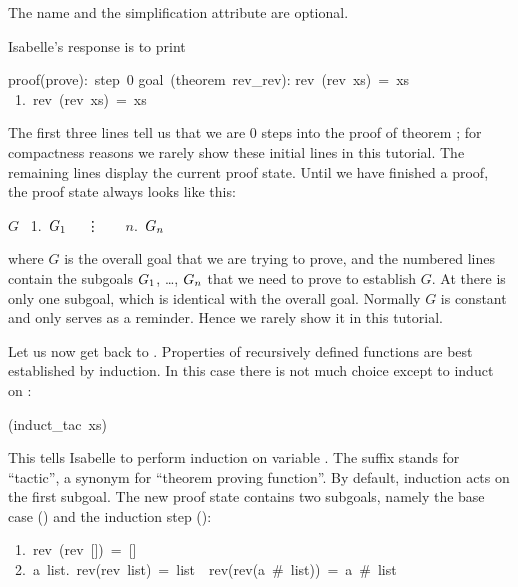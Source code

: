 \begin{isabelle}
\begin{isamarkuptxt}
\begin{itemize}
The name and the simplification attribute are optional.
\end{itemize}
Isabelle's response is to print
\begin{isabellepar}%
proof(prove):~step~0\isanewline
\isanewline
goal~(theorem~rev\_rev):\isanewline
rev~(rev~xs)~=~xs\isanewline
~1.~rev~(rev~xs)~=~xs
\end{isabellepar}%
The first three lines tell us that we are 0 steps into the proof of
theorem ; for compactness reasons we rarely show these
initial lines in this tutorial. The remaining lines display the current
proof state.
Until we have finished a proof, the proof state always looks like this:
\begin{isabellepar}%
$G$\isanewline
~1.~$G\sb{1}$\isanewline
~~\vdots~~\isanewline
~$n$.~$G\sb{n}$
\end{isabellepar}%
where $G$
is the overall goal that we are trying to prove, and the numbered lines
contain the subgoals $G\sb{1}$, \dots, $G\sb{n}$ that we need to prove to
establish $G$. At  there is only one subgoal, which is
identical with the overall goal.  Normally $G$ is constant and only serves as
a reminder. Hence we rarely show it in this tutorial.

Let us now get back to . Properties of recursively
defined functions are best established by induction. In this case there is
not much choice except to induct on :%
\end{isamarkuptxt}%
(induct\_tac~xs)%
\begin{isamarkuptxt}%
\noindent{}%
This tells Isabelle to perform induction on variable . The suffix
 stands for ``tactic'', a synonym for ``theorem proving function''.
By default, induction acts on the first subgoal. The new proof state contains
two subgoals, namely the base case () and the induction step
():
\begin{isabellepar}%
~1.~rev~(rev~[])~=~[]\isanewline
~2.~{\isasymAnd}a~list.~rev(rev~list)~=~list~{\isasymLongrightarrow}~rev(rev(a~\#~list))~=~a~\#~list%
\end{isabellepar}%


\end{isamarkuptxt}
\end{isabelle}
